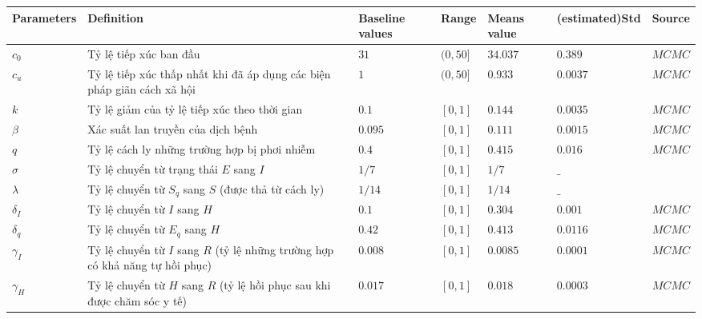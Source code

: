\renewcommand{\arraystretch}{1.25}
\begin{tabular}{l p{5.5cm} l l l l l}
\hline 
 Parameters & Definition & Baseline values & Range & Means value & (estimated)Std & Source \\
\hline 
 $\displaystyle c_{0}$ & Tỷ lệ tiếp xúc ban đầu & $\displaystyle 31$ & $\displaystyle ( 0,50]$ & $\displaystyle 34.037$ & $\displaystyle 0.389$ & $\displaystyle MCMC$ \\
$\displaystyle c_{u}$ & Tỷ lệ tiếp xúc thấp nhất khi đã áp dụng các biện pháp giãn cách xã hội & $\displaystyle 1$ & $\displaystyle ( 0,50]$ & $\displaystyle 0.933$ & $\displaystyle 0.0037$ & $\displaystyle MCMC$ \\
$\displaystyle k$ & Tỷ lệ giảm của tỷ lệ tiếp xúc theo thời gian & $\displaystyle 0.1$ & $\displaystyle [ 0,1]$ & $\displaystyle 0.144$ & $\displaystyle 0.0035$ & $\displaystyle MCMC$ \\
$\displaystyle \beta $ & Xác suất lan truyền của dịch bệnh & $\displaystyle 0.095$ & $\displaystyle [ 0,1]$ & $\displaystyle 0.111$ & $\displaystyle 0.0015$ & $\displaystyle MCMC$ \\
$\displaystyle q$ & Tỷ lệ cách ly những trường hợp bị phơi nhiễm & $\displaystyle 0.4$ & $\displaystyle [ 0,1]$ & $\displaystyle 0.415$ & $\displaystyle 0.016$ & $\displaystyle MCMC$ \\
$\displaystyle \sigma $ & Tỷ lệ chuyển từ trạng thái $E$ sang $I$ & $\displaystyle 1/7$ & $\displaystyle [ 0,1]$ & $\displaystyle 1/7$ & $\displaystyle \_$ & \cite{ncovid} \\
$\displaystyle \lambda $ & Tỷ lệ chuyển từ $S_q$ sang $S$ (được thả từ cách ly) & $\displaystyle 1/14$ & $\displaystyle [ 0,1]$ & $\displaystyle 1/14$ & $\displaystyle \_$ & \cite{ncovid} \\
$\displaystyle \delta _{I}$ & Tỷ lệ chuyển từ $I$ sang $H$ & $\displaystyle 0.1$ & $\displaystyle [ 0,1]$ & $\displaystyle 0.304$ & $\displaystyle 0.001$ & $\displaystyle MCMC$ \\
$\displaystyle \delta _{q}$ & Tỷ lệ chuyển từ $E_q$ sang $H$ & $\displaystyle 0.42$ & $\displaystyle [ 0,1]$ & $\displaystyle 0.413$ & $\displaystyle 0.0116$ & $\displaystyle MCMC$ \\
$\displaystyle \gamma _{I}$ & Tỷ lệ chuyển từ $I$ sang $R$ (tỷ lệ những trường hợp có khả năng tự hồi phục) & $\displaystyle 0.008$ & $\displaystyle [ 0,1]$ & $\displaystyle 0.0085$ & $\displaystyle 0.0001$ & $\displaystyle MCMC$ \\
$\displaystyle \gamma _{H}$ & Tỷ lệ chuyển từ $H$ sang $R$ (tỷ lệ hồi phục sau khi được chăm sóc y tế) & $\displaystyle 0.017$ & $\displaystyle [ 0,1]$ & $\displaystyle 0.018$ & $\displaystyle 0.0003$ & $\displaystyle MCMC$ \\

\end{tabular}
